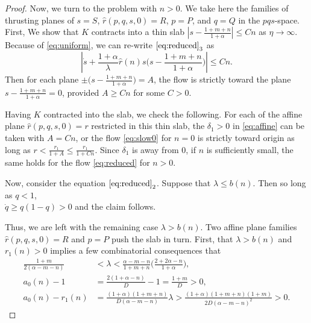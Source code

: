\documentclass[a4paper,11pt]{article}
\begin{document}
{\begin{proof}
Now, we turn to the problem with $n>0$. We take here the families of thrusting planes of $s=S$, $\hat{r}(p,q,s,0)=R$, $p=P$, and $q=Q$ in the $pqs$-space.
First, We show that $K$ contracts into a thin slab $|s - \frac{1+m+n}{1+\alpha}| \le Cn$ as $\eta \rightarrow \infty$. 
Because of \eqref{eq:uniform}, we can re-write $\eqref{eq:reduced}_3$ as
 $$ \left|\dot{s} +\frac{1+\alpha}{\lambda}\hat{r}(n)s\big(s- \frac{1+m+n}{1+\alpha}\big)\right| \le Cn.$$
Then for each plane $\pm\big(s - \frac{1+m+n}{1+\alpha}\big) = A$, the flow is strictly toward the plane $s- \frac{1+m+n}{1+\alpha}=0$, provided $A\ge Cn$ for some $C>0$. 

Having $K$ contracted into the slab, we check the following. For each of the affine plane $\hat{r}(p,q,s,0)=r$ restricted in this thin slab, the $\delta_1>0$ in \eqref{eq:affine} can be taken with $A=Cn$, or the flow \eqref{eq:slow0} for $n=0$ is strictly toward origin as long as $r < \frac{r_1}{1+A} \le \frac{r_1}{1+Cn}$. Since $\delta_1$ is away from $0$, if $n$ is sufficiently small, the same holds for the flow \eqref{eq:reduced} for $n>0$.

Now, consider the equation $\eqref{eq:reduced}_2$. Suppose that $\lambda\le b(n)$. Then so long as $q<1$, \\$\dot{q} \ge q(1-q)>0$ and the claim follows.

Thus, we are left with the remaining case $\lambda > b(n)$. Two affine plane families $\hat{r}(p,q,s,0)=R$ and $p=P$ push the slab in turn. First, that $\lambda > b(n)$ and $r_1(n)>0$ implies a few combinatorial consequences that
\begin{equation}\label{eq:combi}
 \begin{aligned}
  \frac{1+m}{2(\alpha-m-n)} &< \lambda < \frac{\alpha-m-n}{1+m+n}\Big(\frac{2+2\alpha-n}{1+\alpha}\Big),\\
  a_0(n)-1 &= \frac{2(1+\alpha-n)}{D} - 1 = \frac{1+m}{D} > 0,\\
  a_0(n)-r_1(n)&= \frac{(1+\alpha)(1+m+n)}{D(\alpha-m-n)}\lambda >\frac{(1+\alpha)(1+m+n)(1+m)}{2D(\alpha-m-n)^2}>0.
 \end{aligned}
\end{equation}




\end{proof}}
\end{document}
